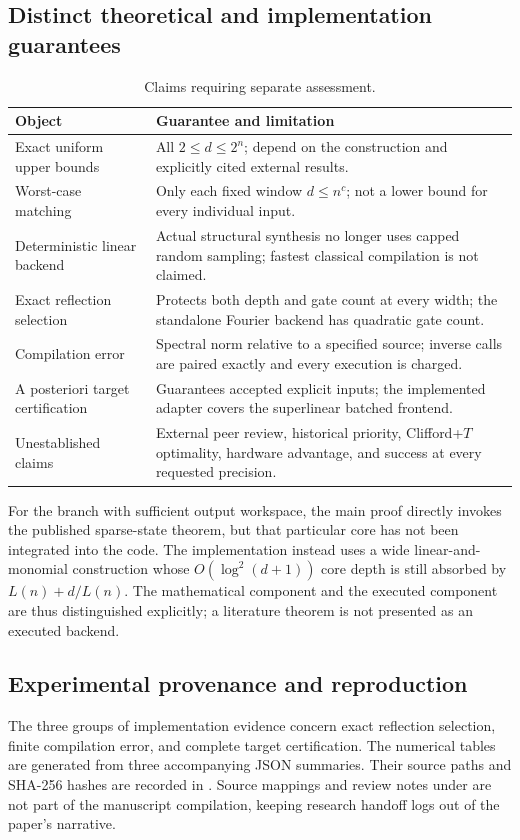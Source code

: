 \subsection{Distinct theoretical and implementation guarantees}
\begin{table}[htbp]
\centering\small
\caption{Claims requiring separate assessment.}\label{tab:claims}
\begin{tabularx}{\linewidth}{@{}>{\raggedright\arraybackslash}p{36mm}Y@{}}
\toprule
Object & Guarantee and limitation\\
\midrule
Exact uniform upper bounds & All $2\le d\le2^n$; depend on the construction and explicitly cited external results.\\
Worst-case matching & Only each fixed window $d\le n^c$; not a lower bound for every individual input.\\
Deterministic linear backend & Actual structural synthesis no longer uses capped random sampling; fastest classical compilation is not claimed.\\
Exact reflection selection & Protects both depth and gate count at every width; the standalone Fourier backend has quadratic gate count.\\
Compilation error & Spectral norm relative to a specified source; inverse calls are paired exactly and every execution is charged.\\
A posteriori target certification & Guarantees accepted explicit inputs; the implemented adapter covers the superlinear batched frontend.\\
Unestablished claims & External peer review, historical priority, Clifford+$T$ optimality, hardware advantage, and success at every requested precision.\\
\bottomrule
\end{tabularx}
\end{table}

For the branch with sufficient output workspace, the main proof directly invokes the published sparse-state theorem, but that particular core has not been integrated into the code. The implementation instead uses a wide linear-and-monomial construction whose $O(\log^2(d+1))$ core depth is still absorbed by $L(n)+d/L(n)$. The mathematical component and the executed component are thus distinguished explicitly; a literature theorem is not presented as an executed backend.

\subsection{Experimental provenance and reproduction}
The three groups of implementation evidence concern exact reflection selection, finite compilation error, and complete target certification. The numerical tables are generated from three accompanying JSON summaries. Their source paths and SHA-256 hashes are recorded in . Source mappings and review notes under  are not part of the manuscript compilation, keeping research handoff logs out of the paper's narrative.

